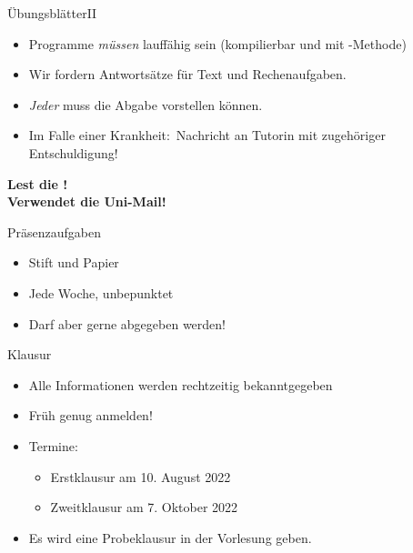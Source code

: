 \begin{frame}[t]{Übungsblätter\hfill II}
    \begin{itemize}[<+(1)->]
        \itemsep10.5pt
        \item Programme \emph{müssen} lauffähig sein (kompilierbar und mit -Methode)\pause
        \item Wir fordern Antwortsätze für Text und Rechenaufgaben.
        \item \emph{Jeder} muss die Abgabe vorstellen können.\pause{}
        \item Im Falle einer Krankheit:\pause~Nachricht an Tutor\gend in mit zugehöriger Entschuldigung!\pause{}
    \end{itemize}
    \vfill
    \begin{center}
        \pause\bfseries Lest die !\\
        \pause\bfseries Verwendet die Uni-Mail!
    \end{center}
\end{frame}

\iffull
\begin{frame}[t]{Präsenzaufgaben}
    \begin{itemize}[<+(1)->]
        \itemsep10pt
        \item Stift und Papier 
        \item Jede Woche, unbepunktet
        \item Darf aber gerne abgegeben werden!
    \end{itemize}
\end{frame}
\fi

\begin{frame}{Klausur}
    \begin{itemize}[<+(1)->]
        \itemsep16pt
        \item Alle Informationen werden rechtzeitig bekanntgegeben
        \item Früh genug anmelden!
        \item Termine: \begin{itemize}
            \item Erstklausur am 10. August 2022
            \item Zweitklausur am 7. Oktober 2022
        \end{itemize}
        \item Es wird eine Probeklausur in der Vorlesung geben.\pause{}
    \end{itemize}
\end{frame}

